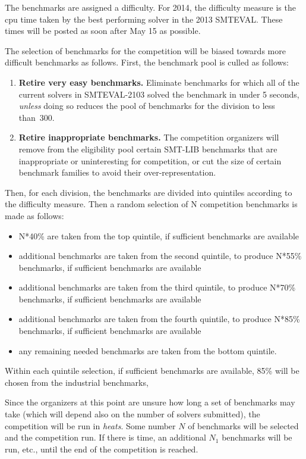\documentclass[12pt]{article}
\begin{document}

The benchmarks are assigned a difficulty. For 2014, the difficulty measure is the
cpu time taken by the best performing solver in the 2013 SMTEVAL. These times will be posted 
as soon after May 15 as possible.

The selection of benchmarks for the competition will be biased towards more difficult benchmarks
as follows. First, the benchmark pool is culled as follows:
\begin{enumerate}

\item \textbf{Retire very easy benchmarks.} %
  Eliminate benchmarks for which all of the current solvers in SMTEVAL-2103
  solved the benchmark in under 5 seconds,
  \emph{unless} doing so reduces the pool of
    benchmarks for the division to less than~300.

\item \textbf{Retire inappropriate benchmarks.} %
  The competition organizers will remove from the eligibility pool
  certain SMT-LIB benchmarks that are inappropriate or uninteresting
  for competition, or cut the size of certain benchmark families to
  avoid their over-representation.

\end{enumerate}

Then, for each division, the benchmarks are divided into quintiles according to the difficulty measure.
Then a random selection of N competition benchmarks is made as follows:
\begin{itemize}
\item N*40\% are taken from the top quintile, if sufficient benchmarks are available
\item additional benchmarks are taken from the second quintile, to produce N*55\% benchmarks, if sufficient benchmarks are available
\item additional benchmarks are taken from the third quintile, to produce N*70\% benchmarks, if sufficient benchmarks are available
\item additional benchmarks are taken from the fourth quintile, to produce N*85\% benchmarks, if sufficient benchmarks are available
\item any remaining needed benchmarks are taken from the bottom quintile.
\end{itemize}
Within each quintile selection, if sufficient benchmarks are available, 85\% will be chosen from the industrial benchmarks,

Since the organizers at this point are unsure how long a set of benchmarks may take (which will depend also on the number of solvers submitted), the competition will be run in {\em heats}. Some number $N$ of benchmarks will be selected and the competition run. If there is time, an additional $N_1$ benchmarks will be run, etc., until the end of the competition is reached.
\end{document}
